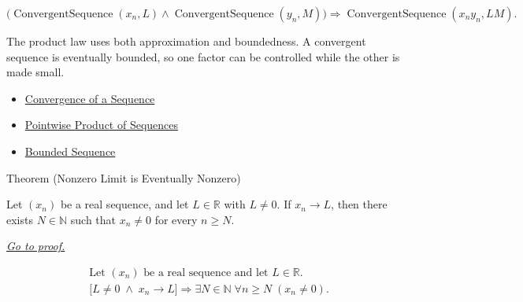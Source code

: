 \begin{remark*}
\[
\bigl(
\operatorname{ConvergentSequence}(x_n,L)
\land
\operatorname{ConvergentSequence}(y_n,M)
\bigr)
\Longrightarrow
\operatorname{ConvergentSequence}(x_ny_n,LM).
\]
\end{remark*}

\begin{remark*}[Interpretation]
The product law uses both approximation and boundedness. A convergent sequence
is eventually bounded, so one factor can be controlled while the other is made
small.
\end{remark*}

\begin{dependencies}
\begin{itemize}
  \item \hyperref[def:convergent-sequence]{Convergence of a Sequence}
  \item \hyperref[def:pointwise-product-sequence]{Pointwise Product of Sequences}
  \item \hyperref[def:bounded-sequence]{Bounded Sequence}
\end{itemize}
\end{dependencies}


\begin{theorembox}{Theorem (Nonzero Limit is Eventually Nonzero)}
\begin{theorem}
\label{thm:nonzero-limit-eventually-nonzero}
Let $(x_n)$ be a real sequence, and let $L\in\mathbb{R}$ with $L\neq 0$.
If $x_n\to L$, then there exists $N\in\mathbb{N}$ such that $x_n\neq 0$
for every $n\ge N$.

\smallskip
\noindent
\hyperref[prf:nonzero-limit-eventually-nonzero]{\textit{Go to proof.}}
\end{theorem}
\end{theorembox}

\begin{remark*}
\[
\begin{aligned}
&\text{Let } (x_n) \text{ be a real sequence and let } L\in\mathbb{R}.\\
&\bigl[
L\neq 0 \;\land\; x_n\to L
\bigr]
\Longrightarrow
\exists N\in\mathbb{N}\;\forall n\ge N\;(x_n\neq 0).
\end{aligned}
\]
\end{remark*}

